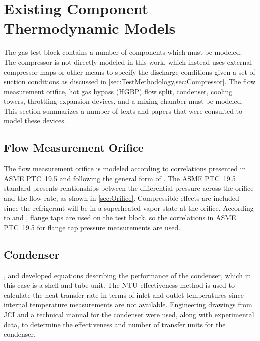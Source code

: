 
\section{Existing Component Thermodynamic Models}
The  gas test block contains a number of components which must be modeled. 
The compressor is not directly modeled in this work, 
which instead uses external compressor maps or other means 
to specify the discharge conditions given a set of suction conditions
as discussed in \cref{sec:TestMethodology,sec:Compressor}. 
The flow measurement orifice, hot gas bypass (HGBP) flow split, condenser, cooling towers, 
throttling expansion devices, and a mixing chamber must be modeled. 
This section summarizes a number of texts and papers that were consulted to model these devices.

\subsection{Flow Measurement Orifice}
The flow measurement orifice is modeled according to correlations presented in 
ASME PTC~19.5 \parencite{ptc19} and following the general form of \textcite{munson2009}. 
The ASME PTC~19.5 standard presents relationships between 
the differential pressure across the orifice and the flow rate, as shown in \cref{sec:Orifice}. 
Compressible effects are included since the refrigerant will be in a 
superheated vapor state at the orifice.
According to \textcite{trevino2012} and \textcite{flow1984}, flange taps
are used on the test block, so the correlations in ASME PTC~19.5
for flange tap pressure measurements are used.

\subsection{Condenser}
\textcites{incropera2007}{incropera1985}, and \textcite{kays1984} 
developed equations describing the performance of the condenser, 
which in this case is a shell-and-tube unit. 
The $\mathrm{NTU}$-effectiveness method is used to calculate the heat transfer rate
in terms of inlet and outlet temperatures since internal temperature measurements are not available. 
Engineering drawings from JCI \parencite{cond1983} and a technical manual
for the condenser \parencite{condman} were used, along with experimental data,
to determine the effectiveness and number of transfer units for the condenser.

